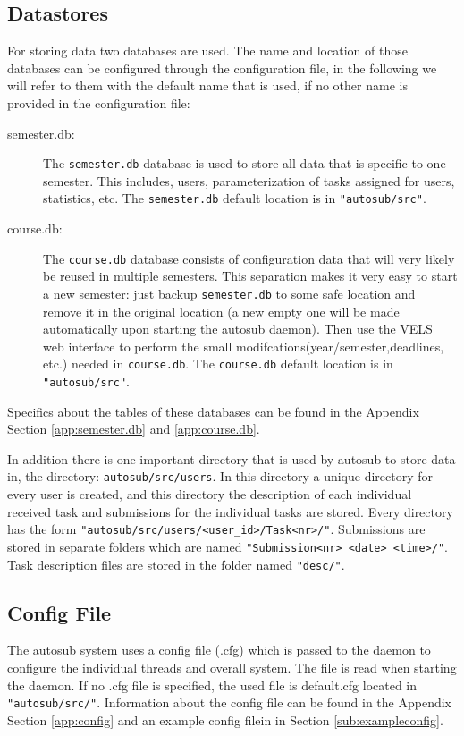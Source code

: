 \subsection{Datastores}
For storing data two databases are used. The name and location of those databases 
can be configured through the configuration file, in the following we will refer to 
them with the default name that is used, if no other name is provided in the 
configuration file:
\begin{description}
\item [semester.db: ] The {\tt semester.db} database is used to store all data that is
    specific to one semester. This includes, users, parameterization of tasks assigned
    for users, statistics, etc. The {\tt semester.db} default location is in
	{\tt "autosub/src"}.
\item [course.db: ] The {\tt course.db} database consists of configuration data that will
    very likely be reused in multiple semesters. This separation makes it very easy
    to start a new semester: just backup {\tt semester.db} to some safe location and
    remove it in the original location (a new empty one will be made automatically upon 
    starting the autosub daemon). Then use the VELS web interface to perform the small 
    modifcations(year/semester,deadlines, etc.) needed in {\tt course.db}. The
    {\tt course.db} default location is in {\tt "autosub/src"}.
\end{description}
Specifics about the tables of these databases can be found in the Appendix Section
\ref{app:semester.db} and \ref{app:course.db}.

In addition there is one important directory that is used by autosub to store data in,
the directory: {\tt autosub/src/users}. In this directory a unique directory for every
user is created, and this directory the description of each individual received task 
and submissions for the individual tasks are stored. Every directory has the form 
{\tt "autosub/src/users/<user\_id>/Task<nr>/"}. Submissions are stored in separate 
folders which are named {\tt "Submission<nr>\_<date>\_<time>/"}. Task description files 
are stored in the folder named {\tt "desc/"}.

\subsection{Config File}
The autosub system uses a config file (.cfg) which is passed to the daemon to configure the
individual threads and overall system. The file is read when starting the daemon. If no
.cfg file is specified, the used file is default.cfg located in {\tt "autosub/src/"}. 
Information about the config file can be found in the Appendix Section \ref{app:config}
and an example config filein in Section \ref{sub:exampleconfig}.

